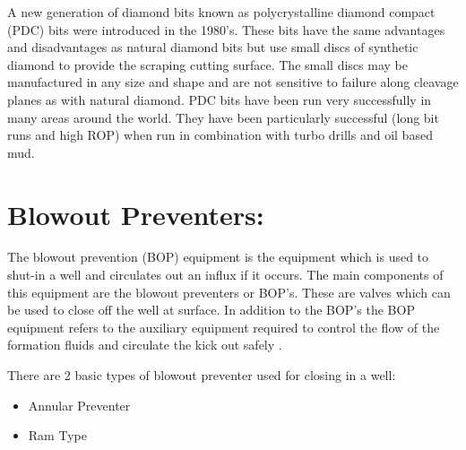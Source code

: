  A new generation of diamond bits
known as polycrystalline diamond compact (PDC)
bits were introduced in the 1980’s. These bits have
the same advantages and disadvantages as natural
diamond bits but use small discs of synthetic
diamond to provide the scraping cutting surface. The
small discs may be manufactured in any size and
shape and are not sensitive to failure along cleavage
planes as with natural diamond. PDC bits have been
run very successfully in many areas around the
world. They have been particularly successful (long
bit runs and high ROP) when run in combination with
turbo drills and oil based mud.

\vspace{1em}

\section*{Blowout Preventers:}

The blowout prevention (BOP)
equipment is the equipment which is used to shut-in a
well and circulates out an influx if it occurs. The
main components of this equipment are the blowout
preventers or BOP's. These are valves which can be
used to close off the well at surface. In addition to the
BOP's the BOP equipment refers to the auxiliary
equipment required to control the flow of the
formation fluids and circulate the kick out safely .

\vspace{1em}


There are 2 basic types of blowout preventer used for closing in a
well:
\begin{itemize}
\item Annular Preventer
\item Ram Type
\end{itemize}
 
